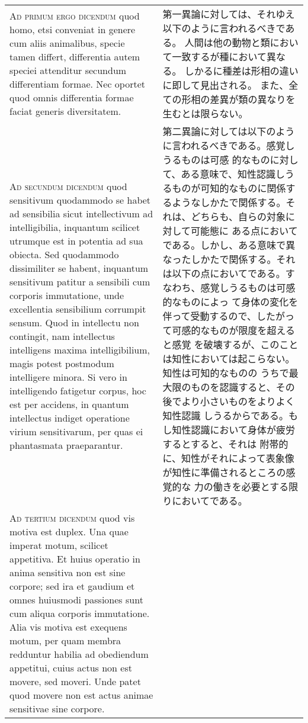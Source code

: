 \documentclass[paper=a4paper,fontsize=10pt,jafontsize=9pt,titlepage]{jlreq}
\begin{document}
\begin{longtable}{p{21em}p{21em}}
\\



{\scshape Ad primum ergo dicendum} quod homo, etsi conveniat in genere cum aliis
animalibus, specie tamen differt, differentia autem speciei attenditur
secundum differentiam formae. Nec oportet quod omnis differentia
formae faciat generis diversitatem.

&

第一異論に対しては、それゆえ以下のように言われるべきである。
人間は他の動物と類において一致するが種において異なる。
しかるに種差は形相の違いに即して見出される。
また、全ての形相の差異が類の異なりを生むとは限らない。

\\



{\scshape Ad secundum dicendum} quod sensitivum quodammodo se habet ad sensibilia
sicut intellectivum ad intelligibilia, inquantum scilicet utrumque est
in potentia ad sua obiecta. Sed quodammodo dissimiliter se habent,
inquantum sensitivum patitur a sensibili cum corporis immutatione,
unde excellentia sensibilium corrumpit sensum. Quod in intellectu non
contingit, nam intellectus intelligens maxima intelligibilium, magis
potest postmodum intelligere minora. Si vero in intelligendo fatigetur
corpus, hoc est per accidens, in quantum intellectus indiget
operatione virium sensitivarum, per quas ei phantasmata praeparantur.

&

第二異論に対しては以下のように言われるべきである。感覚しうるものは可感
的なものに対して、ある意味で、知性認識しうるものが可知的なものに関係す
るようなしかたで関係する。それは、どちらも、自らの対象に対して可能態に
ある点においてである。しかし、ある意味で異なったしかたで関係する。それ
は以下の点においてである。すなわち、感覚しうるものは可感的なものによっ
て身体の変化を伴って受動するので、したがって可感的なものが限度を超えると感覚
を破壊するが、このことは知性においては起こらない。知性は可知的なものの
 うちで最大限のものを認識すると、その後でより小さいものをよりよく知性認識
 しうるからである。もし知性認識において身体が疲労するとすると、それは
 附帯的に、知性がそれによって表象像が知性に準備されるところの感覚的な
 力の働きを必要とする限りにおいてである。

\\



{\scshape Ad tertium dicendum} quod vis motiva est duplex. Una quae imperat
motum, scilicet appetitiva. Et huius operatio in anima sensitiva non
est sine corpore; sed ira et gaudium et omnes huiusmodi passiones sunt
cum aliqua corporis immutatione. Alia vis motiva est exequens motum,
per quam membra redduntur habilia ad obediendum appetitui, cuius actus
non est movere, sed moveri. Unde patet quod movere non est actus
animae sensitivae sine corpore.


\end{longtable}
\end{document}

